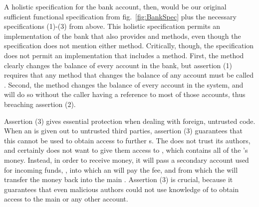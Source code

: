A  holistic  specification for the bank account, then,
would be our original sufficient functional specification from
fig.~\ref{fig:BankSpec} plus the necessary
specifications (1)-(3) from above. %
This holistic specification
permits an implementation of the bank that also provides  
and  methods, even though the specification does not mention either method.
Critically, though, the \Chainmail specification
does not permit an
implementation that includes a  method.
First, the  method clearly changes the balance of
every account in the bank, but assertion (1) requires that any method
that changes the balance of any account must be called .
Second, the  method changes the balance of every account in
the system, and will do so without the caller having a reference to
most of those accounts, thus breaching assertion (2).   
 
Assertion (3) gives essential protection when dealing with foreign, untrusted code.
When an  is given out to untrusted third parties, assertion (3) guarantees that
this  cannot be used to obtain access to further  s. 
The  does not trust its authors, and certainly does not want
to give them access to , which contains all of
the 's money. Instead, in order to receive money, it will
pass a secondary account used for incoming funds, ,
into which an   will pay the fee, and from which the  will transfer the money
back into the main . Assertion (3) is crucial, because it guarantees that even 
malicious authors  could not use knowledge of   to obtain access to
the main  or any other account. %

